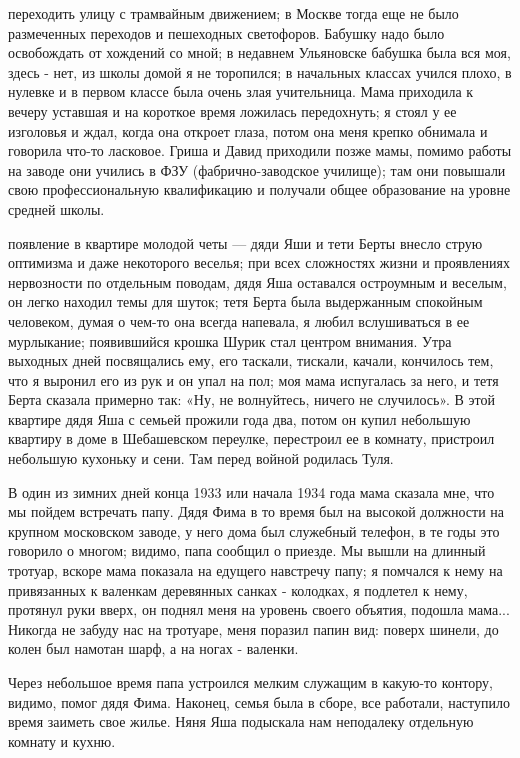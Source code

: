 переходить улицу с трамвайным движением; в Москве тогда еще не было размеченных переходов и пешеходных светофоров. Бабушку надо было освобождать от хождений со мной; в недавнем Ульяновске бабушка была вся моя, здесь - нет, из школы домой я не торопился; в начальных классах учился плохо, в нулевке и в первом классе была очень злая учительница. Мама приходила к вечеру уставшая и на короткое время ложилась передохнуть; я стоял у ее изголовья и ждал, когда она откроет глаза, потом она меня крепко обнимала и говорила что-то ласковое. Гриша и Давид приходили позже мамы, помимо работы на заводе они учились в ФЗУ (фабрично-заводское училище); там они повышали свою профессиональную квалификацию и получали общее образование на уровне средней школы.

появление в квартире молодой четы — дяди Яши и тети Берты внесло струю оптимизма и даже некоторого веселья; при всех сложностях жизни и проявлениях нервозности по отдельным поводам, дядя Яша оставался остроумным и веселым, он легко находил темы для шуток; тетя Берта была выдержанным спокойным человеком, думая о чем-то она всегда напевала, я любил вслушиваться в ее мурлыкание; появившийся крошка Шурик стал центром внимания. Утра выходных дней посвящались ему, его таскали, тискали, качали, кончилось тем, что я выронил его из рук и он упал на пол; моя мама испугалась за него, и тетя Берта сказала примерно так: «Ну, не волнуйтесь, ничего не случилось». В этой квартире дядя Яша с семьей прожили года два, потом он купил небольшую квартиру в доме в Шебашевском переулке, перестроил ее в комнату, пристроил небольшую кухоньку и сени. Там перед войной родилась Туля.

В один из зимних дней конца 1933 или начала 1934 года мама сказала мне, что мы пойдем встречать папу. Дядя Фима в то время был на высокой должности на крупном московском заводе, у него дома был служебный телефон, в те годы это говорило о многом; видимо, папа сообщил о приезде. Мы вышли на длинный тротуар, вскоре мама показала на едущего навстречу папу; я помчался к нему на привязанных к валенкам деревянных санках - колодках, я подлетел к нему, протянул руки вверх, он поднял меня на уровень своего объятия, подошла мама... Никогда не забуду нас на тротуаре, меня поразил папин вид: поверх шинели, до колен был намотан шарф, а на ногах - валенки.

Через небольшое время папа устроился мелким служащим в какую-то контору, видимо, помог дядя Фима. Наконец, семья была в сборе, все работали, наступило время заиметь свое жилье. Няня Яша подыскала нам неподалеку отдельную комнату и кухню.

